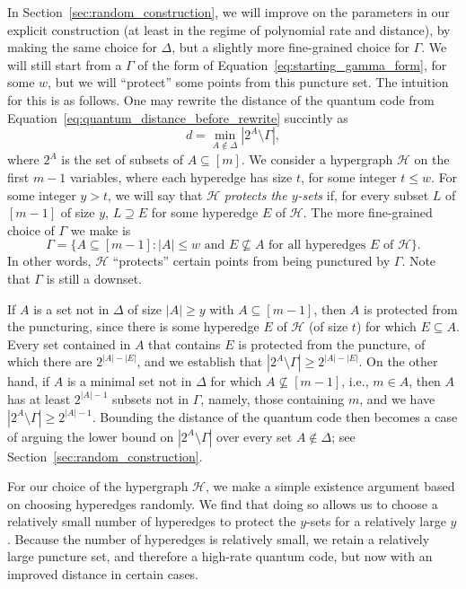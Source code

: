 \documentclass{article}
\begin{document}
In Section~\ref{sec:random_construction}, we will improve on the parameters in our explicit construction (at least in the regime of polynomial rate and distance), by making the same choice for $\Delta$, but a slightly more fine-grained choice for $\Gamma$. We will still start from a $\Gamma$ of the form of Equation~\eqref{eq:starting_gamma_form}, for some $w$, but we will ``protect'' some points from this puncture set. The intuition for this is as follows. One may rewrite the distance of the quantum code from Equation~\eqref{eq:quantum_distance_before_rewrite} succintly as
\begin{equation}\label{eq:succinct_distance_expression}
    d = \min_{A \notin \Delta}\left|2^A \setminus \Gamma\right|,
\end{equation}
where $2^A$ is the set of subsets of $A \subseteq [m]$. We consider a hypergraph $\mathcal{H}$ on the first $m-1$ variables, where each hyperedge has size $t$, for some integer $t \leq w$. For some integer $y > t$, we will say that $\mathcal{H}$ \textit{protects the $y$-sets} if, for every subset $L$ of $[m-1]$ of size $y$, $L \supseteq E$ for some hyperedge $E$ of $\mathcal{H}$. The more fine-grained choice of $\Gamma$ we make is
\begin{equation}
    \Gamma = \{A \subseteq [m-1]: |A| \leq w \text{ and } E \not\subseteq A \text{ for all hyperedges } E \text{ of } \mathcal{H}\}.
\end{equation}
In other words, $\mathcal{H}$ ``protects'' certain points from being punctured by $\Gamma$. Note that $\Gamma$ is still a downset.

If $A$ is a set not in $\Delta$ of size $|A| \geq y$ with $A \subseteq [m-1]$, then $A$ is protected from the puncturing, since there is some hyperedge $E$ of $\mathcal{H}$ (of size $t$) for which $E \subseteq A$. Every set contained in $A$ that contains $E$ is protected from the puncture, of which there are $2^{|A|-|E|}$, and we establish that $\left|2^A\setminus \Gamma\right| \geq 2^{|A|-|E|}$. On the other hand, if $A$ is a minimal set not in $\Delta$ for which $A \not\subseteq [m-1]$, i.e., $m \in A$, then $A$ has at least $2^{|A|-1}$ subsets not in $\Gamma$, namely, those containing $m$, and we have $\left|2^A \setminus \Gamma\right| \geq 2^{|A|-1}$. Bounding the distance of the quantum code then becomes a case of arguing the lower bound on $\left|2^{A}\setminus \Gamma\right|$ over every set $A \notin \Delta$; see Section~\ref{sec:random_construction}.

For our choice of the hypergraph $\mathcal{H}$, we make a simple existence argument based on choosing hyperedges randomly. We find that doing so allows us to choose a relatively small number of hyperedges to protect the $y$-sets for a relatively large $y$. Because the number of hyperedges is relatively small, we retain a relatively large puncture set, and therefore a high-rate quantum code, but now with an improved distance in certain cases.
\end{document}
